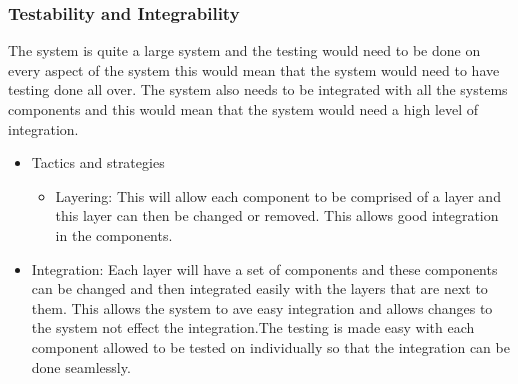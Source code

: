 \subsubsection{Testability and Integrability}
\begin{flushleft}
The system is quite a large system and the testing would need to be done on every aspect of the system this would mean that the system would need to have testing done all over. The system also needs to be integrated with all the systems components and this would mean that the system would need a high level of integration.
\begin{itemize}
\item{Tactics and strategies}
\begin{itemize}
\item{Layering}: This will allow each component to be comprised of a layer and this layer can then be changed or removed. This allows good integration in the components.

\end{itemize}

\item{Integration}: Each layer will have a set of components and these components can be changed and then integrated easily with the layers that are next to them. This allows the system to ave easy integration and allows changes to the system not effect the integration.The testing is made easy with each component allowed to be tested on individually so that the integration can be done seamlessly.
\end{itemize}

\end{flushleft}
		